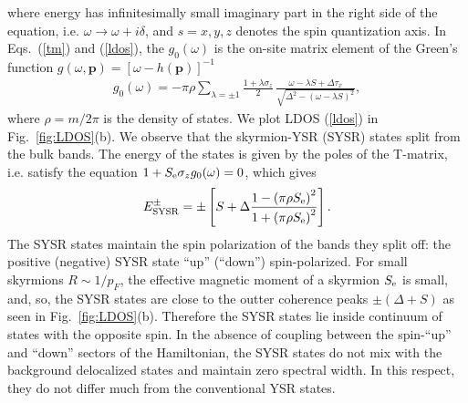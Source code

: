 \documentclass[twocolumn,showpacs,floatfix,nofootinbib,longbibliography]{revtex4-1}
\begin{document}
 where energy has infinitesimally small imaginary part in the right side of the equation, i.e. $\omega\rightarrow \omega+i\delta$, and $s=x,y,z$ denotes the spin quantization axis. In Eqs.~(\ref{tm}) and (\ref{ldos}), the $g_0(\omega)$ is the on-site matrix element of the Green's function $g(\omega,\bm p) = [\omega-h(\bm p)]^{-1}$
 \begin{align}
	 g_{0}(\omega)  =-\pi\rho\sum_{\lambda = \pm 1} \frac{1+\lambda\sigma_z}{2}\,\frac{\omega-\lambda S+\Delta\tau_x}{\sqrt{\Delta^2-\left( \omega-\lambda S \right)^2}},  \label{grf}
\end{align}
where $\rho = m/2\pi$ is the density of states. We plot LDOS (\ref{ldos}) in Fig.~\ref{fig:LDOS}(b). We observe that the skyrmion-YSR (SYSR) states split from the bulk bands. The energy of the states is given by the poles of the T-matrix, i.e. satisfy the equation $1+S_{\rm e}\sigma_zg_{0}(\omega)=0$, which gives
\begin{align}
	E^\pm_{\rm SYSR} = \pm\left[S+\Delta \frac{1-\left( \pi\rho S_{\rm e} \right)^2}{1+\left( \pi\rho S_{\rm e} \right)^2}\right].
	\label{energy}
\end{align}
 The SYSR states maintain the spin polarization of the bands they split off: the positive (negative) SYSR state ``up'' (``down'') spin-polarized. For small skyrmions $R\sim 1/p_F$, the effective magnetic moment of a skyrmion $S_{\rm e}$ is small, and, so, the SYSR states are close to the outter  coherence peaks $\pm(\Delta+S)$ as seen in Fig.~\ref{fig:LDOS}(b).  Therefore the SYSR states lie inside continuum of states with the opposite spin. In the absence of coupling between the spin-``up'' and ``down'' sectors of the Hamiltonian, the SYSR states do not mix with the background delocalized states and maintain zero spectral width. In this respect, they do not differ much from the conventional YSR states.
\end{document}
